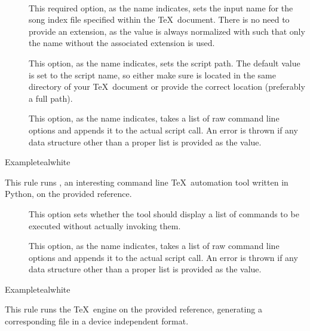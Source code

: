 \begin{description}
\begin{description}
\item[~\rqbox] This required option, as the name indicates, sets the input name for the song index file specified within the \TeX\ document. There is no need to provide an extension, as the value is always normalized with  such that only the name without the associated extension is used.

\item[] This option, as the name indicates, sets the script path. The default value is set to the script name, so either make sure  is located in the same directory of your \TeX\ document or provide the correct location (preferably a full path).

\item[] This option, as the name indicates, takes a list of raw command line options and appends it to the actual script call. An error is thrown if any data structure other than a proper list is provided as the value.
\end{description}

\begin{codebox}{Example}{teal}{\icnote}{white}
\end{codebox}

\item[\rulebox{spix}]
This rule runs , an interesting command line \TeX\ automation tool written in Python, on the provided  reference.

\begin{description}
\item[] This option sets whether the tool should display a list of commands to be executed without actually invoking them.

\item[] This option, as the name indicates, takes a list of raw command line options and appends it to the actual script call. An error is thrown if any data structure other than a proper list is provided as the value.
\end{description}

\begin{codebox}{Example}{teal}{\icnote}{white}
\end{codebox}

\item[\rulebox{tex}]
This rule runs the  \TeX\ engine on the provided  reference, generating a corresponding file in a device independent format.


\end{description}

